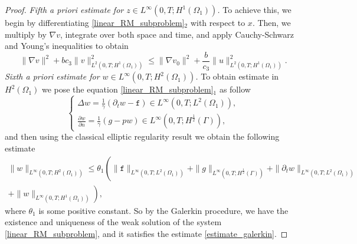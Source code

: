 \documentclass[11pt]{article}
\begin{document}
\begin{proof}
\textit{Fifth a priori estimate for $z\in L^{\infty}(0,T; H^1(\Omega_1))$.} To achieve this, we begin by differentiating \eqref{linear_RM_subproblem}$_{2}$ with respect to \( x \). Then, we multiply by \( \nabla v \), integrate over both space and time, and apply Cauchy-Schwarz and Young's inequalities to obtain
\begin{equation}
    \parallel \nabla v\parallel^2 + bc_3 \parallel v \parallel^2_{L^2(0, T; H^1(\Omega_1))} \leq \parallel \nabla v_0\parallel^2 + \frac{b}{c_3} \parallel u \parallel^2_{L^2(0, T; H^1(\Omega_1))}.
\end{equation}
\textit{Sixth a priori estimate for $w\in L^{\infty}(0,T; H^2(\Omega_1))$.} To obtain estimate in $H^2(\Omega_1)$ we pose the equation \eqref{linear_RM_subproblem}$_{1}$ as follow 
\begin{equation}\label{elliptic_problem}
\begin{cases}
 \Delta w =\frac{1}{\gamma}\left( \partial_t w- \mathtt{f}\right) \in L^{\infty}(0,T; L^2(\Omega_1)),\\
\frac{\partial w}{\partial n} 
 = \frac{1}{\gamma}\left( g-pw \right)  \in L^{\infty}(0,T; H^{\frac{1}{2}}(\Gamma)),
\end{cases}
\end{equation}
and then using the classical elliptic regularity result \cite{lions2012non} we obtain the following estimate 
\begin{equation}\label{apriori12}
\begin{split}
\parallel w\parallel_{L^{\infty}(0,T; H^2(\Omega_1))}   \leq 
 \theta_1\left( \parallel \mathtt{f} \parallel_{L^{\infty}(0,T; L^2(\Omega_1))} + \parallel g\parallel_{L^{\infty}(0,T; H^{\frac{1}{2}}(\Gamma))} + \parallel \partial_t w \parallel_{L^{\infty}(0,T; L^2(\Omega_1))} \right.\\ 
 \left. +\parallel w \parallel_{L^{\infty}(0,T; H^1(\Omega_1))}\right),
\end{split}
\end{equation}
where $\theta_1$ is some positive constant. So by the Galerkin procedure, we have the existence and uniqueness of the weak solution of the system \eqref{linear_RM_subproblem}, and it satisfies the estimate \eqref{estimate_galerkin}.
\end{proof}
\end{document}
